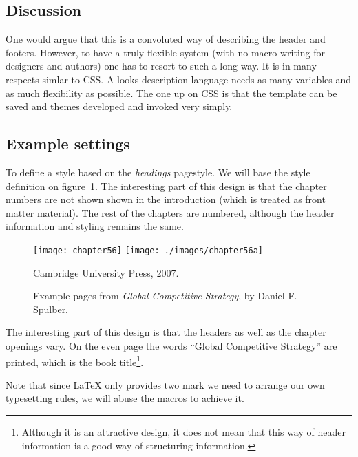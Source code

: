 \subsection{Discussion}

One would argue that this is a convoluted way of describing the header and footers. However, to have a truly flexible system (with no macro writing for designers and authors) one has to resort to such a long way. It is in many respects simlar to CSS. A looks description language needs as many variables and as much flexibility as possible. The one up on CSS is that the template can be saved and themes developed and invoked very simply.

\subsection{Example settings}

To define a style based on the \textit{headings} pagestyle. We will base the style definition on figure~\ref{globalstrategy}. The interesting part of this design is that the chapter numbers are not shown shown in the introduction (which is treated as front matter material). The rest of the chapters are numbered, although the header information and styling remains the same.

\begin{figure}[hp]
\centering
\texttt{[image: chapter56]}\vspace{0.5\baselineskip}
\texttt{[image: ./images/chapter56a]}
\caption{Example pages from \textit{Global Competitive Strategy}, by Daniel F. Spulber,} Cambridge University Press, 2007.
\label{globalstrategy}
\end{figure}

The interesting part of this design is that the headers as well as the chapter openings vary. On the even page the words ``Global Competitive Strategy'' are printed, which is the book title\footnote{Although it is an attractive design, it does not mean that this way of header information is a good way of structuring information.}.

Note that since LaTeX only provides two mark we need to arrange our own typesetting rules, we will abuse the macros to achieve it.

